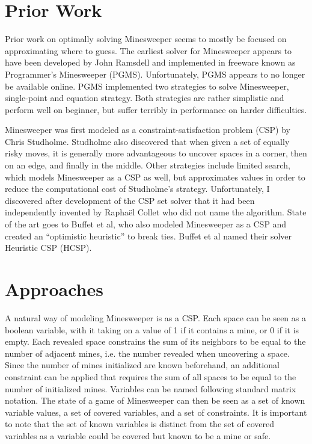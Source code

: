 \documentclass[letterpaper]{article}
\begin{document}
\section{Prior Work}
Prior work on optimally solving Minesweeper seems to mostly be focused on approximating where to guess.  The earliest solver for Minesweeper appears to have been developed by John Ramsdell and implemented in freeware known as Programmer's Minesweeper (PGMS).  Unfortunately, PGMS appears to no longer be available online.  PGMS implemented two strategies to solve Minesweeper, single-point and equation strategy.  Both strategies are rather simplistic and perform well on beginner, but suffer terribly in performance on harder difficulties.

Minesweeper was first modeled as a constraint-satisfaction problem (CSP) by Chris Studholme.  Studholme also discovered that when given a set of equally risky moves, it is generally more advantageous to uncover spaces in a corner, then on an edge, and finally in the middle.  Other strategies include limited search, which models Minesweeper as a CSP as well, but approximates values in order to reduce the computational cost of Studholme's strategy.  Unfortunately, I discovered after development of the CSP set solver that it had been independently invented by Rapha\"el Collet who did not name the algorithm.  State of the art goes to Buffet et al, who also modeled Minesweeper as a CSP and created an ``optimistic heuristic'' to break ties.  Buffet et al named their solver Heuristic CSP (HCSP).

\section{Approaches}
A natural way of modeling Minesweeper is as a CSP.  Each space can be seen as a boolean variable, with it taking on a value of 1 if it contains a mine, or 0 if it is empty.  Each revealed space constrains the sum of its neighbors to be equal to the number of adjacent mines, i.e. the number revealed when uncovering a space.  Since the number of mines initialized are known beforehand, an additional constraint can be applied that requires the sum of all spaces to be equal to the number of initialized mines.  Variables can be named following standard matrix notation.  The state of a game of Minesweeper can then be seen as a set of known variable values, a set of covered variables, and a set of constraints.  It is important to note that the set of known variables is distinct from the set of covered variables as a variable could be covered but known to be a mine or safe.
\end{document}

